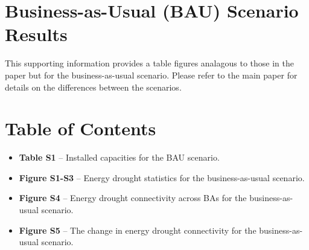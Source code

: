 \documentclass[final]{agujournal2019}
\begin{document}





\section*{Business-as-Usual (BAU) Scenario Results}

This supporting information provides a table figures analagous to those in the paper but for the business-as-usual scenario. Please refer to the main paper for details on the differences between the scenarios. 

\section*{Table of Contents}

\begin{itemize}
    \item[] \textbf{Table S1} -- Installed capacities for the BAU scenario.
    \item[] \textbf{Figure S1-S3} -- Energy drought statistics for the business-as-usual scenario. \item[] \textbf{Figure S4} -- Energy drought connectivity across BAs for the business-as-usual scenario. 
    \item[] \textbf{Figure S5} -- The change in energy drought connectivity for the business-as-usual scenario.
\end{itemize}
\end{document}
